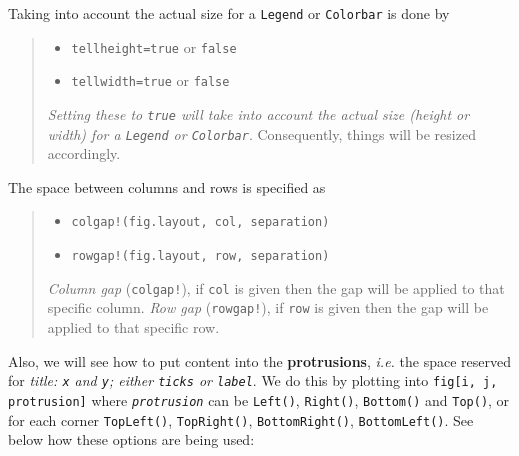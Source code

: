 \documentclass[
  notoc %
]{tufte-book}
\providecommand{\tightlist}{%
  \setlength{\itemsep}{0pt}\setlength{\parskip}{0pt}
}
\newcommand{\passthrough}[1]{#1}
\begin{document}
Taking into account the actual size for a
\passthrough{\lstinline!Legend!} or \passthrough{\lstinline!Colorbar!}
is done by

\begin{quote}
\begin{itemize}
\tightlist
\item
  \passthrough{\lstinline!tellheight=true!} or
  \passthrough{\lstinline!false!}
\item
  \passthrough{\lstinline!tellwidth=true!} or
  \passthrough{\lstinline!false!}
\end{itemize}

\emph{Setting these to \passthrough{\lstinline!true!} will take into
account the actual size (height or width) for a
\passthrough{\lstinline!Legend!} or \passthrough{\lstinline!Colorbar!}}.
Consequently, things will be resized accordingly.
\end{quote}

The space between columns and rows is specified as

\begin{quote}
\begin{itemize}
\tightlist
\item
  \passthrough{\lstinline"colgap!(fig.layout, col, separation)"}
\item
  \passthrough{\lstinline"rowgap!(fig.layout, row, separation)"}
\end{itemize}

\emph{Column gap} (\passthrough{\lstinline"colgap!"}), if
\passthrough{\lstinline!col!} is given then the gap will be applied to
that specific column. \emph{Row gap}
(\passthrough{\lstinline"rowgap!"}), if \passthrough{\lstinline!row!} is
given then the gap will be applied to that specific row.
\end{quote}

Also, we will see how to put content into the \textbf{protrusions},
\emph{i.e.} the space reserved for \emph{title:
\passthrough{\lstinline!x!} and \passthrough{\lstinline!y!}; either
\passthrough{\lstinline!ticks!} or \passthrough{\lstinline!label!}}. We
do this by plotting into \passthrough{\lstinline!fig[i, j, protrusion]!}
where \emph{\passthrough{\lstinline!protrusion!}} can be
\passthrough{\lstinline!Left()!}, \passthrough{\lstinline!Right()!},
\passthrough{\lstinline!Bottom()!} and \passthrough{\lstinline!Top()!},
or for each corner \passthrough{\lstinline!TopLeft()!},
\passthrough{\lstinline!TopRight()!},
\passthrough{\lstinline!BottomRight()!},
\passthrough{\lstinline!BottomLeft()!}. See below how these options are
being used:
\end{document}
